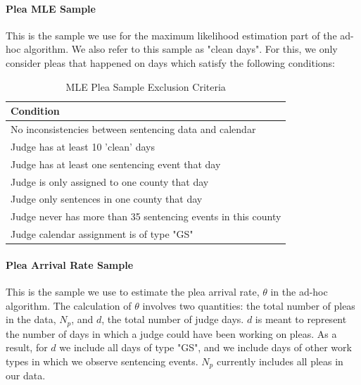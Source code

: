 \documentclass[11pt]{article}
\theoremstyle{ModifiedStyle}
\begin{document}
      \paragraph{Plea MLE Sample} This is the sample we use for the maximum likelihood estimation part of the ad-hoc algorithm. We also refer to this sample as "clean days". For this, we only consider pleas that happened on days which satisfy the following conditions:
        \begin{table}[H]
          \centering
          \caption{MLE Plea Sample Exclusion Criteria}
          \begin{tabular}{|l|}
          \hline
          \textbf{Condition}                                                  \\ \hline
          No inconsistencies between sentencing data and calendar \\ \hline
          Judge has at least 10 'clean' days                      \\ \hline
          Judge has at least one sentencing event that day         \\ \hline
          Judge is only assigned to one county that day          \\ \hline
          Judge only sentences in one county that day             \\ \hline
          Judge never has more than 35 sentencing events in this county \\ \hline
          Judge calendar assignment is of type "GS"           \\ \hline
          \end{tabular}
        \end{table}

      \paragraph{Plea Arrival Rate Sample} This is the sample we use to estimate the plea arrival rate, $\theta$ in the ad-hoc algorithm. The calculation of $\theta$ involves two quantities: the total number of pleas in the data, $N_p$, and $d$, the total number of judge days. $d$ is meant to represent the number of days in which a judge could have been working on pleas. As a result, for $d$ we include all days of type "GS", and we include days of other work types in which we observe sentencing events. $N_p$ currently includes all pleas in our data.
\end{document}
